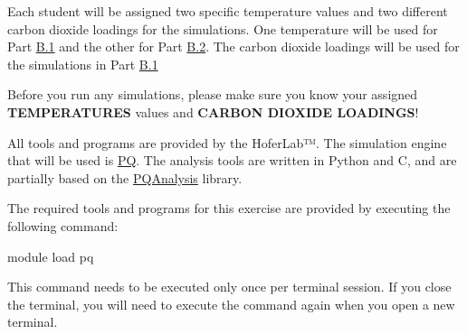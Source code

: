 \documentclass[
  letterpaper,
  DIV=11,
  numbers=noendperiod]{scrreprt}
\newenvironment{Shaded}{\begin{snugshade}}{\end{snugshade}}
\newcommand{\ExtensionTok}[1]{\textcolor[rgb]{0.00,0.23,0.31}{#1}}
\newcommand{\NormalTok}[1]{\textcolor[rgb]{0.00,0.23,0.31}{#1}}
\begin{document}
Each student will be assigned two specific temperature values and two
different carbon dioxide loadings for the simulations. One temperature
will be used for Part
\protect\hyperlink{part-b.1-gas-simulation-in-zif-8}{B.1} and the other
for Part \protect\hyperlink{part-b.2-thermal-expansion-of-zif-8}{B.2}.
The carbon dioxide loadings will be used for the simulations in Part
\protect\hyperlink{part-b.1-gas-simulation-in-zif-8}{B.1}

\begin{tcolorbox}[enhanced jigsaw, title=\textcolor{quarto-callout-important-color}{\faExclamation}\hspace{0.5em}{Important}, colbacktitle=quarto-callout-important-color!10!white, bottomtitle=1mm, breakable, colframe=quarto-callout-important-color-frame, toprule=.15mm, opacitybacktitle=0.6, bottomrule=.15mm, titlerule=0mm, arc=.35mm, rightrule=.15mm, toptitle=1mm, coltitle=black, left=2mm, opacityback=0, colback=white, leftrule=.75mm]

Before you run any simulations, please make sure you know your assigned
\textbf{TEMPERATURES} values and \textbf{CARBON DIOXIDE LOADINGS}!

\end{tcolorbox}

All tools and programs are provided by the HoferLab™. The simulation
engine that will be used is \href{https://github.com/MolarVerse/PQ}{PQ}.
The analysis tools are written in Python and C, and are partially based
on the \href{https://github.com/MolarVerse/PQAnalysis}{PQAnalysis}
library.

The required tools and programs for this exercise are provided by
executing the following command:

\begin{Shaded}
\begin{Highlighting}[]
\ExtensionTok{module}\NormalTok{ load pq}
\end{Highlighting}
\end{Shaded}

\begin{tcolorbox}[enhanced jigsaw, title=\textcolor{quarto-callout-important-color}{\faExclamation}\hspace{0.5em}{Important}, colbacktitle=quarto-callout-important-color!10!white, bottomtitle=1mm, breakable, colframe=quarto-callout-important-color-frame, toprule=.15mm, opacitybacktitle=0.6, bottomrule=.15mm, titlerule=0mm, arc=.35mm, rightrule=.15mm, toptitle=1mm, coltitle=black, left=2mm, opacityback=0, colback=white, leftrule=.75mm]

This command needs to be executed only once per terminal session. If you
close the terminal, you will need to execute the command again when you
open a new terminal.

\end{tcolorbox}
\end{document}
